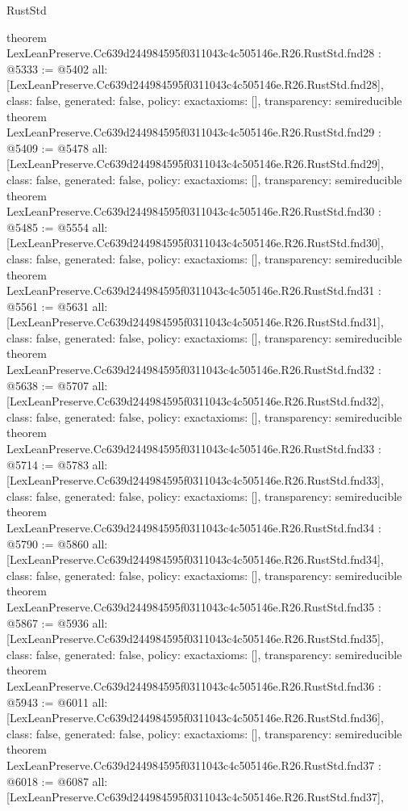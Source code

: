 \begin{lexlean}{RustStd}
\begin{coremodule}
{}
theorem LexLeanPreserve.Cc639d244984595f0311043c4c505146e.R26.RustStd.fnd28 : @5333 := @5402 {
  all: [LexLeanPreserve.Cc639d244984595f0311043c4c505146e.R26.RustStd.fnd28],
  class: false,
  generated: false,
  policy: exact{axioms: []},
  transparency: semireducible
}
theorem LexLeanPreserve.Cc639d244984595f0311043c4c505146e.R26.RustStd.fnd29 : @5409 := @5478 {
  all: [LexLeanPreserve.Cc639d244984595f0311043c4c505146e.R26.RustStd.fnd29],
  class: false,
  generated: false,
  policy: exact{axioms: []},
  transparency: semireducible
}
theorem LexLeanPreserve.Cc639d244984595f0311043c4c505146e.R26.RustStd.fnd30 : @5485 := @5554 {
  all: [LexLeanPreserve.Cc639d244984595f0311043c4c505146e.R26.RustStd.fnd30],
  class: false,
  generated: false,
  policy: exact{axioms: []},
  transparency: semireducible
}
theorem LexLeanPreserve.Cc639d244984595f0311043c4c505146e.R26.RustStd.fnd31 : @5561 := @5631 {
  all: [LexLeanPreserve.Cc639d244984595f0311043c4c505146e.R26.RustStd.fnd31],
  class: false,
  generated: false,
  policy: exact{axioms: []},
  transparency: semireducible
}
theorem LexLeanPreserve.Cc639d244984595f0311043c4c505146e.R26.RustStd.fnd32 : @5638 := @5707 {
  all: [LexLeanPreserve.Cc639d244984595f0311043c4c505146e.R26.RustStd.fnd32],
  class: false,
  generated: false,
  policy: exact{axioms: []},
  transparency: semireducible
}
theorem LexLeanPreserve.Cc639d244984595f0311043c4c505146e.R26.RustStd.fnd33 : @5714 := @5783 {
  all: [LexLeanPreserve.Cc639d244984595f0311043c4c505146e.R26.RustStd.fnd33],
  class: false,
  generated: false,
  policy: exact{axioms: []},
  transparency: semireducible
}
theorem LexLeanPreserve.Cc639d244984595f0311043c4c505146e.R26.RustStd.fnd34 : @5790 := @5860 {
  all: [LexLeanPreserve.Cc639d244984595f0311043c4c505146e.R26.RustStd.fnd34],
  class: false,
  generated: false,
  policy: exact{axioms: []},
  transparency: semireducible
}
theorem LexLeanPreserve.Cc639d244984595f0311043c4c505146e.R26.RustStd.fnd35 : @5867 := @5936 {
  all: [LexLeanPreserve.Cc639d244984595f0311043c4c505146e.R26.RustStd.fnd35],
  class: false,
  generated: false,
  policy: exact{axioms: []},
  transparency: semireducible
}
theorem LexLeanPreserve.Cc639d244984595f0311043c4c505146e.R26.RustStd.fnd36 : @5943 := @6011 {
  all: [LexLeanPreserve.Cc639d244984595f0311043c4c505146e.R26.RustStd.fnd36],
  class: false,
  generated: false,
  policy: exact{axioms: []},
  transparency: semireducible
}
theorem LexLeanPreserve.Cc639d244984595f0311043c4c505146e.R26.RustStd.fnd37 : @6018 := @6087 {
  all: [LexLeanPreserve.Cc639d244984595f0311043c4c505146e.R26.RustStd.fnd37],
}
\end{coremodule}
\end{lexlean}
